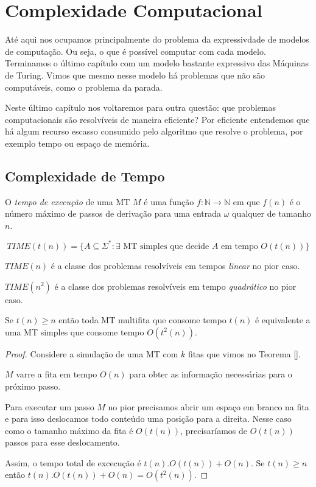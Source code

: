 \chapter{Complexidade Computacional}
\label{cha:complexidade}

Até aqui nos ocupamos principalmente do problema da expressivdade de modelos de computação.
Ou seja, o que é possível computar com cada modelo.
Terminamos o último capítulo com um modelo bastante expressivo das Máquinas de Turing.
Vimos que mesmo nesse modelo há problemas que não são computáveis, como o problema da parada.

Neste último capítulo nos voltaremos para outra questão: que problemas computacionais são resolvíveis de maneira eficiente?
Por eficiente entendemos que há algum recurso escasso consumido pelo algoritmo que resolve o problema, por exemplo tempo ou espaço de memória.

\section{Complexidade de Tempo}
\label{sec:tempo}

O {\em tempo de execução} de uma MT $M$ é uma função $f: \mathbb{N} \to \mathbb{N}$ em que $f(n)$ é o número máximo de passos de derivação para uma entrada $\omega$ qualquer de tamanho $n$.

\begin{displaymath}
  TIME(t(n)) = \{A \subseteq \Sigma^* : \textrm{$\exists$ MT simples que decide $A$ em tempo $O(t(n))$}\}
\end{displaymath}

\begin{example}
  $TIME(n)$ é a classe dos problemas resolvíveis em tempos {\em linear} no pior caso.

  $TIME(n^2)$ é a classe dos problemas resolvíveis em tempo {\em quadrático} no pior caso.
\end{example}

\begin{theorem}
  Se $t(n) \geq n$ então toda MT multifita que consome tempo $t(n)$ é equivalente a uma MT simples que consome tempo $O(t^2(n))$.
\end{theorem}
\begin{proof}
  Considere a simulação de uma MT com $k$ fitas que vimos no Teorema \ref{}.

  $M$ varre a fita em tempo $O(n)$ para obter as informação necessárias para o próximo passo.

  Para executar um passo $M$ no pior precisamos abrir um espaço em branco na fita e para isso deslocamos todo conteúdo uma posição para a direita.
  Nesse caso como o tamanho máximo da fita é $O(t(n))$, precisaríamos de $O(t(n))$ passos para esse deslocamento.

  Assim, o tempo total de excecução é $t(n).O(t(n)) + O(n)$.
  Se $t(n) \geq n$ então $t(n).O(t(n)) + O(n) = O(t^2(n))$.
\end{proof}

